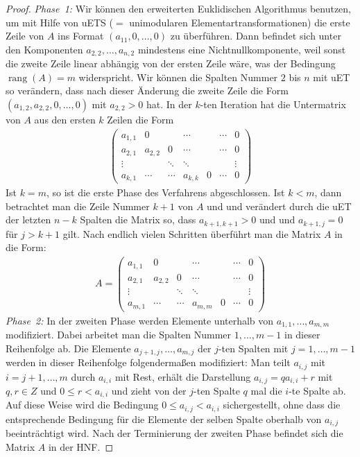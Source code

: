 \documentclass[
a4paper,landscape,16pt,
bibliography=totocnumbered,
numbers=noenddot,
]{scrartcl}
\numberwithin{equation}{subsection}
\newcommand{\rang}{\operatorname{rang}} %
\theoremstyle{plain}
\theoremstyle{definition}
\begin{document}
\begin{proof}
	\emph{Phase~1:} Wir können den erweiterten Euklidischen Algorithmus benutzen, um mit Hilfe von uETS ($=$ unimodularen Elementartransformationen) die erste Zeile von $A$ ins Format $(a_{11}, 0,\ldots, 0)$ zu überführen. 
	Dann befindet sich unter den Komponenten $a_{2,2},\ldots,a_{n,2}$ mindestens eine Nichtnullkomponente, weil sonst die zweite Zeile linear abhängig von der ersten Zeile wäre, was der Bedingung $\rang(A) = m$ widerspricht. Wir können die Spalten Nummer $2$ bis $n$ mit uET so verändern, dass nach dieser Änderung die zweite Zeile die Form $(a_{1,2},a_{2,2},0,\ldots,0)$ mit $a_{2,2}  >0$ hat. In der $k$-ten Iteration hat die Untermatrix von  $A$ aus den ersten $k$  Zeilen die Form 
	\begin{align*}
			\begin{pmatrix*}
					a_{1,1} & 0 &   & \cdots & & \cdots & 0 
\\					a_{2,1} & a_{2,2} & 0 & \cdots & & \cdots & 0 
\\ \vdots  & & \ddots & \ddots &  & & \vdots 
\\ a_{k,1} & \cdots & \cdots & a_{k,k} &  0 & \cdots & 0 
			\end{pmatrix*} 
	\end{align*} 
	Ist $k=m$, so ist die erste Phase des Verfahrens abgeschlossen. Ist $k<m$, dann betrachtet man die Zeile Nummer $k+1$ von $A$ und und verändert durch die uET der letzten $n-k$ Spalten die Matrix so, dass $a_{k+1,k+1}>0$ und und $a_{k+1,j} =0$ für $j> k+1$ gilt. Nach endlich vielen Schritten überführt man die Matrix $A$ in die Form: 
	\begin{align*}
		A=
	\begin{pmatrix*}
		a_{1,1} & 0 &   & \cdots & & \cdots & 0 
		\\					a_{2,1} & a_{2,2} & 0 & \cdots & & \cdots & 0 
		\\ \vdots  & & \ddots & \ddots &  & & \vdots 
		\\ a_{m,1} & \cdots & \cdots & a_{m,m} &  0 & \cdots & 0 
	\end{pmatrix*} 
\end{align*} 
	\emph{Phase~2:} In der zweiten Phase werden Elemente unterhalb von $a_{1,1},\ldots, a_{m,m}$ modifiziert. Dabei  arbeitet man die Spalten Nummer $1,\ldots,m-1$ in dieser Reihenfolge ab. Die Elemente $a_{j+1,j},\ldots, a_{m,j}$ der $j$-ten Spalten mit $j=1,\ldots, m-1$ werden in dieser Reihenfolge folgendermaßen modifiziert: Man teilt $a_{i,j}$ mit $i=j+1,\ldots,m$ durch $a_{i,i}$ mit Rest, erhält die Darstellung $a_{i,j} = q a_{i,i} + r$ mit $q,r \in Z$ und $0 \le r < a_{i,i}$ und zieht von der $j$-ten Spalte $q$ mal die $i$-te Spalte ab. Auf diese Weise wird die Bedingung $0 \le a_{i,j} < a_{i,i}$ sichergestellt, ohne dass die entsprechende Bedingung für die Elemente der selben Spalte oberhalb von $a_{i,j}$ beeinträchtigt wird. Nach der Terminierung der zweiten Phase befindet sich die Matrix $A$ in der HNF. 
	

\end{proof}
\end{document}
